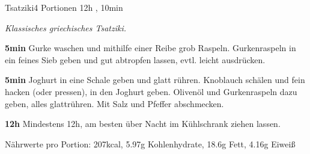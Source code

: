 \documentclass[../recipe-collections/cooking.tex]{subfiles}
\begin{document}
\begin{recipe}{Tsatziki}{4 Portionen }{12h , 10min }

  \freeform{}\textit{Klassisches griechisches Tsatziki.}


  \textbf{5min}
  Gurke waschen und mithilfe einer Reibe grob Raspeln.
  Gurkenraspeln in ein feines Sieb geben und gut abtropfen lassen, evtl. leicht ausdrücken.


  \textbf{5min}
  Joghurt in eine Schale geben und glatt rühren.
  Knoblauch schälen und fein hacken (oder pressen), in den Joghurt geben.
  Olivenöl und Gurkenraspeln dazu geben, alles glattrühren.
  Mit Salz und Pfeffer abschmecken.

  \newstep{}\textbf{12h}
  Mindestens 12h, am besten über Nacht im Kühlschrank ziehen lassen.

  \freeform{}\hrulefill{}

  \freeform{}
  Nährwerte pro Portion: 207kcal, 5.97g Kohlenhydrate, 18.6g Fett, 4.16g Eiweiß

\end{recipe}
\end{document}
